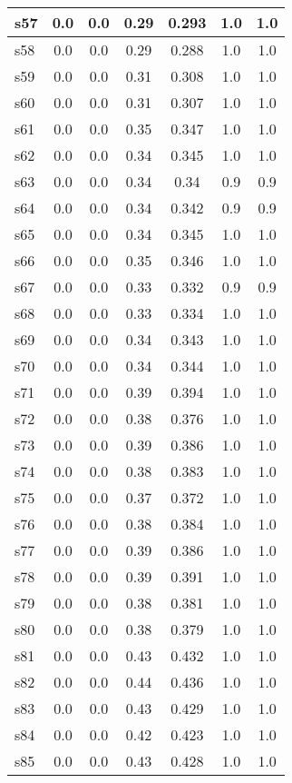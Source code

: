 \documentclass{article}
\begin{document}
\begin{tabular}{|l|c|c|c|c|c|c|}
\hline
s57 &0.0 & 0.0 & 0.29 & 0.293 & 1.0 & 1.0\\
\hline
s58 &0.0 & 0.0 & 0.29 & 0.288 & 1.0 & 1.0\\
\hline
s59 &0.0 & 0.0 & 0.31 & 0.308 & 1.0 & 1.0\\
\hline
s60 &0.0 & 0.0 & 0.31 & 0.307 & 1.0 & 1.0\\
\hline
s61 &0.0 & 0.0 & 0.35 & 0.347 & 1.0 & 1.0\\
\hline
s62 &0.0 & 0.0 & 0.34 & 0.345 & 1.0 & 1.0\\
\hline
s63 &0.0 & 0.0 & 0.34 & 0.34 & 0.9 & 0.9\\
\hline
s64 &0.0 & 0.0 & 0.34 & 0.342 & 0.9 & 0.9\\
\hline
s65 &0.0 & 0.0 & 0.34 & 0.345 & 1.0 & 1.0\\
\hline
s66 &0.0 & 0.0 & 0.35 & 0.346 & 1.0 & 1.0\\
\hline
s67 &0.0 & 0.0 & 0.33 & 0.332 & 0.9 & 0.9\\
\hline
s68 &0.0 & 0.0 & 0.33 & 0.334 & 1.0 & 1.0\\
\hline
s69 &0.0 & 0.0 & 0.34 & 0.343 & 1.0 & 1.0\\
\hline
s70 &0.0 & 0.0 & 0.34 & 0.344 & 1.0 & 1.0\\
\hline
s71 &0.0 & 0.0 & 0.39 & 0.394 & 1.0 & 1.0\\
\hline
s72 &0.0 & 0.0 & 0.38 & 0.376 & 1.0 & 1.0\\
\hline
s73 &0.0 & 0.0 & 0.39 & 0.386 & 1.0 & 1.0\\
\hline
s74 &0.0 & 0.0 & 0.38 & 0.383 & 1.0 & 1.0\\
\hline
s75 &0.0 & 0.0 & 0.37 & 0.372 & 1.0 & 1.0\\
\hline
s76 &0.0 & 0.0 & 0.38 & 0.384 & 1.0 & 1.0\\
\hline
s77 &0.0 & 0.0 & 0.39 & 0.386 & 1.0 & 1.0\\
\hline
s78 &0.0 & 0.0 & 0.39 & 0.391 & 1.0 & 1.0\\
\hline
s79 &0.0 & 0.0 & 0.38 & 0.381 & 1.0 & 1.0\\
\hline
s80 &0.0 & 0.0 & 0.38 & 0.379 & 1.0 & 1.0\\
\hline
s81 &0.0 & 0.0 & 0.43 & 0.432 & 1.0 & 1.0\\
\hline
s82 &0.0 & 0.0 & 0.44 & 0.436 & 1.0 & 1.0\\
\hline
s83 &0.0 & 0.0 & 0.43 & 0.429 & 1.0 & 1.0\\
\hline
s84 &0.0 & 0.0 & 0.42 & 0.423 & 1.0 & 1.0\\
\hline
s85 &0.0 & 0.0 & 0.43 & 0.428 & 1.0 & 1.0\\

\end{tabular}
\end{document}
